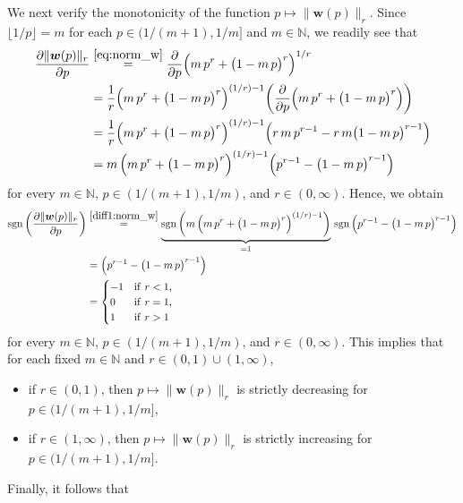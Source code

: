 \documentclass[conference, draftcls, onecolumn]{IEEEtran}
\theoremstyle{plain}
\newcommand{\bvec}[1]{\boldsymbol{#1}}
\newcommand{\sgn}{\operatorname{sgn}}
\newcommand{\lemref}[1]{Lemma~\ref{#1}}
\begin{document}
\begin{IEEEproof}[Proof of \lemref{lem:mono}]
We next verify the monotonicity of the function $p \mapsto \| \bvec{w}( p ) \|_{r}$.
Since $\lfloor 1/p \rfloor = m$ for each $p \in (1/(m+1), 1/m]$ and $m \in \mathbb{N}$, we readily see that
\begin{align}
\frac{ \partial \| \bvec{w}( p ) \|_{r} }{ \partial p }
& \overset{\eqref{eq:norm_w}}{=}
\frac{ \partial }{ \partial p } \Big( m \, p^{r} + \big( 1 - m \, p \big)^{r} \Big)^{1/r}
\\
& =
\frac{1}{r} \Big( m \, p^{r} + \big( 1 - m \, p \big)^{r} \Big)^{(1/r) - 1} \bigg( \frac{ \partial }{ \partial p } \Big( m \, p^{r} + \big( 1 - m \, p \big)^{r} \Big) \bigg)
\\
& =
\frac{1}{r} \Big( m \, p^{r} + \big( 1 - m \, p \big)^{r} \Big)^{(1/r) - 1} \Big( r \, m \, p^{r-1} - r \, m \big( 1 - m \, p \big)^{r-1} \Big)
\\
& =
m \, \Big( m \, p^{r} + \big( 1 - m \, p \big)^{r} \Big)^{(1/r) - 1} \Big( p^{r-1} - \big( 1 - m \, p \big)^{r-1} \Big)
\label{diff1:norm_w}
\end{align}
for every $m \in \mathbb{N}$, $p \in (1/(m+1), 1/m)$, and $r \in (0, \infty)$.
Hence, we obtain
\begin{align}
\sgn \bigg( \frac{ \partial \| \bvec{w}( p ) \|_{r} }{ \partial p } \bigg)
& \overset{\eqref{diff1:norm_w}}{=}
\underbrace{ \sgn \bigg( m\, \Big( m \, p^{r} + \big( 1 - m \, p \big)^{r} \Big)^{(1/r) - 1} \bigg) }_{= 1} \, \sgn \Big( p^{r-1} - \big( 1 - m \, p \big)^{r-1} \Big)
\\
& =
\Big( p^{r-1} - \big( 1 - m \, p \big)^{r-1} \Big)
\\
& =
\begin{cases}
-1
& \mathrm{if} \ r < 1 ,
\\
0
& \mathrm{if} \ r = 1 ,
\\
1
& \mathrm{if} \ r > 1
\end{cases}
\label{eq:sgn_diff1_norm_w}
\end{align}
for every $m \in \mathbb{N}$, $p \in (1/(m+1), 1/m)$, and $r \in (0, \infty)$.
This implies that for each fixed $m \in \mathbb{N}$ and $r \in (0, 1) \cup (1, \infty)$,
\begin{itemize}
\item
if $r \in (0, 1)$, then $p \mapsto \| \bvec{w}( p ) \|_{r}$ is strictly decreasing for $p \in (1/(m+1), 1/m]$,
\item
if $r \in (1, \infty)$, then $p \mapsto \| \bvec{w}( p ) \|_{r}$ is strictly increasing for $p \in (1/(m+1), 1/m]$.
\end{itemize}
Finally, it follows that

\end{IEEEproof}
\end{document}
